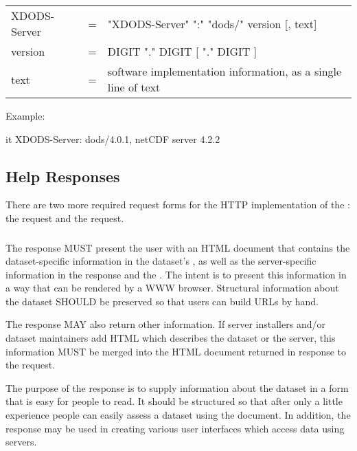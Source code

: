 \documentclass[justify]{dods-paper}
\begin{document}
\begin{ttfamily}
\begin{center}
\begin{tabular}{lll}
XDODS-Server & = & "XDODS-Server" ":" "dods/" version [, text] \\
version & = & DIGIT "." DIGIT [ "." DIGIT ] \\
text & = & software implementation information, as a single line of text
\end{tabular}
\end{center}
\end{ttfamily}

Example:

\begin{vcode}{it}
XDODS-Server: dods/4.0.1, netCDF server 4.2.2
\end{vcode}

\subsection{Help Responses}
\label{sec-help-response}

There are two more required request forms for the HTTP implementation
of the \DAP: the \INFO request and the \HELP request.  

\subsubsection{\INFO}
\label{sec-info}

The \INFO response MUST present the user with an HTML document that
contains the dataset-specific information in the dataset's \DDX, as
well as the server-specific information in the \VER response and the
\CapX.  The intent is to present this information in a way that can be
rendered by a WWW browser.  Structural information about the dataset
SHOULD be preserved so that users can build \DAP URLs by hand.

The \INFO response MAY also return other information. If server
installers and/or dataset maintainers add HTML which describes the
dataset or the server, this information MUST be merged into the HTML
document returned in response to the \INFO request.

The purpose of the \INFO response is to supply information about the
dataset in a form that is easy for people to read. It should be
structured so that after only a little experience people can easily
assess a dataset using the document. In addition, the \INFO response
may be used in creating various user interfaces which access data
using \DAP servers.
\end{document}
